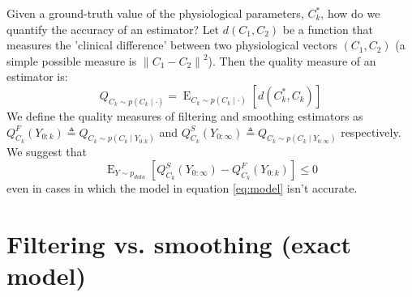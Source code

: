 \documentclass[oneside,12pt]{article}
\newcommand{\norm}[1]{\left\lVert#1\right\rVert}       %
\begin{document}
Given a ground-truth value of the physiological parameters, $C_k^*$, how do we quantify the accuracy of an estimator? Let $d(C_1, C_2)$ be a function that measures the 'clinical difference' between two physiological vectors $(C_1, C_2)$ (a simple possible measure is $\norm{C_1-C_2}^2$). Then the quality measure of an estimator is:
\begin{equation}\label{eq:estQ}
    Q_{C_k \sim p(C_k \mid \cdot)} = \operatorname{E}_{C_k \sim p(C_k \mid \cdot)} \left[ d(C_k^*, C_k) \right]
\end{equation}
We define the quality measures of filtering and smoothing estimators as $Q^F_{C_k}(Y_{0:k}) \triangleq Q_{C_k \sim p(C_k \mid Y_{0:k})}$ and $Q^S_{C_k}(Y_{0:\infty}) \triangleq Q_{C_k \sim p(C_k \mid Y_{0:\infty})}$ respectively. We suggest that 
\begin{equation}\label{eq:mainClaim}
    \operatorname{E}_{Y \sim p_{data}}\left[Q^S_{C_k}(Y_{0:\infty}) - Q^F_{C_k}(Y_{0:k})\right] \leq 0 
\end{equation}
even in cases in which the model in equation \ref{eq:model} isn't accurate. 
%
%
%
\section{Filtering vs. smoothing (exact model)}\label{sec:F_vs_S}
%
\end{document}
